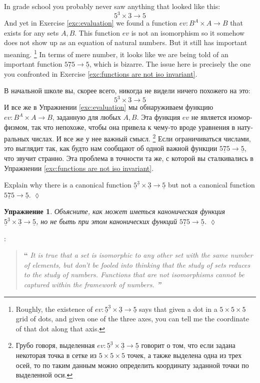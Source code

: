 \documentclass[a4paper]{book}
\def\to{\rightarrow}
\def\taking{\colon}
\def\too{\longrightarrow}
\def\ul{\underline}
\theoremstyle{myth}
\newtheorem{excENG}[envENG]{\begin{english}Exercise\end{english}}
\newenvironment{exerciseENG}{\begin{excENG}}{\hspace*{\fill}$\lozenge$\end{excENG}}
\newenvironment{sloganENG}{\addtocounter{envENG}{1}\vspace{.1in}\begin{sloppypar}\noindent{\em Slogan}\;\arabic{envENG}: \begin{quote}{\bf “}\slshape}{{\bf ”}\end{quote}\end{sloppypar}\vspace{.1in}}
\newtheorem{excRUS}[envRUS]{Упражнение}
\newenvironment{exerciseRUS}{\begin{excRUS}}{\hspace*{\fill}$\lozenge$\end{excRUS}}
\begin{document}
\begin{russian}
In grade school you probably never saw anything that looked like this:
$$5^3\times 3\too 5$$
And yet in Exercise \ref{exc:evaluation} we found a function $ev\taking B^A\times A\to B$ that exists for any sets $A,B$. This function $ev$ is not an isomorphism so it somehow does not show up as an equation of natural numbers. But it still has important meaning.%
\footnote{Roughly, the existence of $ev\taking\ul{5}^{\ul{3}}\times\ul{3}\too \ul{5}$ says that given a dot in a $5\times 5\times 5$ grid of dots, and given one of the three axes, you can tell me the coordinate of that dot along that axis.} In terms of mere number, it looks like we are being told of an important function $\ul{575}\to\ul{5}$, which is bizarre. The issue here is precisely the one you confronted in Exercise \ref{exc:functions are not iso invariant}.

В начальной школе вы, скорее всего, никогда не видели ничего похожего на это:
$$5^3\times 3\too 5$$
И все же в Упражнении \ref{exc:evaluation} мы обнаруживаем функцию $ev\taking B^A\times A\to B$, заданную для любых $A,B$. Эта функция $ev$ не является изоморфизмом, так что непохоже, чтобы она привела к чему-то вроде уравнения в натуральных числах. И все же у нее важный смысл.%
\footnote{Грубо говоря, выделенная $ev\taking\ul{5}^{\ul{3}}\times\ul{3}\too \ul{5}$ говорит о том, что если задана некоторая точка в сетке из $5\times 5\times 5$ точек, а также выделена одна из трех осей, то по таким данным можно определить координату заданной точки по выделенной оси.}
Если ограничиваться числами, это выглядит так, как будто нам сообщают об одной важной функции $\ul{575}\to\ul{5}$, что звучит странно. Эта проблема в точности та же, с которой вы сталкивались в Упражнении \ref{exc:functions are not iso invariant}.

\begin{exerciseENG}
Explain why there is a canonical function $\ul{5}^{\ul{3}}\times\ul{3}\too \ul{5}$ but not a canonical function $\ul{575}\to\ul{5}$.
\end{exerciseENG}

\begin{exerciseRUS}
Объясните, как может иметься каноническая функция $\ul{5}^{\ul{3}}\times\ul{3}\too \ul{5}$, но не быть при этом канонических функций $\ul{575}\to\ul{5}$.
\end{exerciseRUS}

\begin{sloganENG}
It is true that a set is isomorphic to any other set with the same number of elements, but don't be fooled into thinking that the study of sets reduces to the study of numbers. Functions that are not isomorphisms cannot be captured within the framework of numbers. 
\end{sloganENG}


\end{russian}
\end{document}
